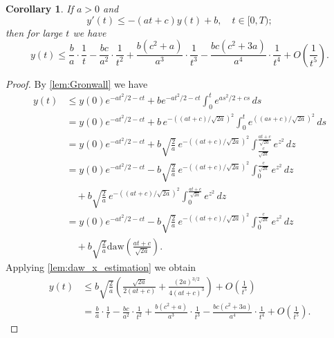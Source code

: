 \documentclass[pdflatex,sn-mathphys-num]{sn-jnl}
\theoremstyle{thmstyleone}
\newtheorem{corollary}{Corollary}[section]
\theoremstyle{thmstyletwo}
\theoremstyle{thmstylethree}
\begin{document}
\begin{corollary}\label{cor:upper_diff_ineq}
If $a>0$ and 
\begin{equation}
y'(t)\leq -(at+c)y(t)+b,\quad t\in[0,T);
\end{equation}
then for large $t$ we have  
\begin{equation}
y(t)\leq \frac{b}{a} \cdot \frac{1}{t} - \frac{bc}{a^2} \cdot \frac{1}{t^2} + \frac{b(c^2 + a)}{a^3} \cdot \frac{1}{t^3} - \frac{bc(c^2 + 3a)}{a^4} \cdot \frac{1}{t^4} + O\left(\frac{1}{t^5}\right).
\end{equation}
\end{corollary}
\begin{proof}
By \autoref{lem:Gronwall} we have 
\begin{align*}
y(t) &\leq y(0)e^{-at^2/2-ct}+be^{-at^2/2-ct}
\int_0^t e^{as^2/2+cs}\,ds \\
&=y(0)e^{-at^2/2-ct}+b\,e^{-((at+c)/\sqrt{2a})^2}
\int_0^t e^{((as+c)/\sqrt{2a})^2}\, ds\\
&=y(0)e^{-at^2/2-ct}+b\sqrt{\frac{2}{a}}\,e^{-((at+c)/\sqrt{2a})^2}
\int_{\frac{c}{\sqrt{2a}}}^{\frac{at+c}{\sqrt{2a}}} e^{z^2}\,dz\\
&= y(0)e^{-at^2/2-ct}-b\sqrt{\frac{2}{a}}\,e^{-((at+c)/\sqrt{2a})^2}
\int_0^{\frac{c}{\sqrt{2a}}} e^{z^2}\,dz\\
&\quad +b\sqrt{\frac{2}{a}}\,e^{-((at+c)/\sqrt{2a})^2}
\int_0^{\frac{at+c}{\sqrt{2a}}} e^{z^2}\,dz\\
&=y(0)e^{-at^2/2-ct}-b\sqrt{\frac{2}{a}}\,e^{-((at+c)/\sqrt{2a})^2}
\int_0^{\frac{c}{\sqrt{2a}}} e^{z^2}\,dz\\
&\quad +b\sqrt{\frac{2}{a}} \mathrm{daw}\left( 
\frac{at+c}{\sqrt{2a}} \right).
\end{align*}
Applying \autoref{lem:daw_x_estimation} we obtain
\begin{align*}
y(t) &\leq b\sqrt{\frac{2}{a}} 
\left(
\frac{\sqrt{2a}}{2(at+c)}+\frac{(2a)^{3/2}}{4(at+c)^3}
\right) + O\left(\frac{1}{t^5} \right) \\
&=\frac{b}{a} \cdot \frac{1}{t} - \frac{bc}{a^2} \cdot \frac{1}{t^2} + \frac{b(c^2 + a)}{a^3} \cdot \frac{1}{t^3} - \frac{bc(c^2 + 3a)}{a^4} \cdot \frac{1}{t^4} + O\left(\frac{1}{t^5}\right).
\end{align*}
\end{proof}
\end{document}
